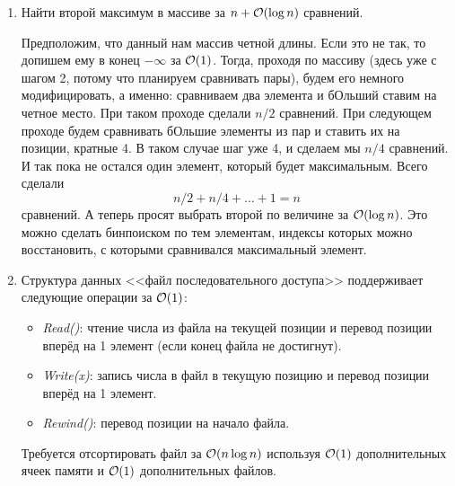 \begin{enumerate}
  \item
	Найти второй максимум в массиве за $n + \mathcal{O}(\log n)$ сравнений.
	\begin{solution}
		Предположим, что данный нам массив четной длины. Если это не так, то допишем ему в конец $-\infty$ за $\mathcal{O}(1)$. Тогда, проходя по массиву (здесь уже с шагом 2, потому что планируем сравнивать пары), будем его немного модифицировать, а именно: сравниваем два элемента и бОльший ставим на четное место. При таком проходе сделали $n/2$ сравнений. При следующем проходе будем сравнивать бОльшие элементы из пар и ставить их на позиции, кратные 4. В таком случае шаг уже 4, и сделаем мы $n/4$ сравнений. И так пока не остался один элемент, который будет максимальным. Всего сделали
		\begin{equation}
			n/2 + n/4 + \ldots + 1 = n
		\end{equation}
		сравнений. А теперь просят выбрать второй по величине за $\mathcal{O}(\log n)$. Это можно сделать бинпоиском по тем элементам, индексы которых можно восстановить, с которыми сравнивался максимальный элемент.
	\end{solution}

  \item
	Структура данных <<файл последовательного доступа>>
	поддерживает следующие операции за $\mathcal{O}(1)$:
	\begin{itemize}
		\item \emph{Read()}: чтение числа из файла на текущей
		позиции и перевод позиции вперёд на 1 элемент (если конец файла не достигнут).
		\item \emph{Write(x)}: запись числа в файл в текущую
		позицию и перевод позиции вперёд на 1 элемент.
		\item \emph{Rewind()}: перевод позиции на начало файла.
	\end{itemize}

	Требуется отсортировать файл за $\mathcal{O}(n \log{n})$ используя
	$\mathcal{O}(1)$ дополнительных ячеек памяти и $\mathcal{O}(1)$ дополнительных файлов.




\end{enumerate}
